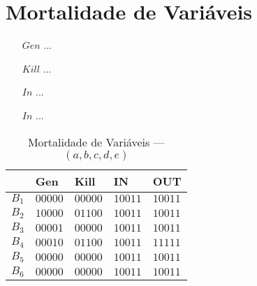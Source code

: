 \section{Mortalidade de Vari\'aveis}

\begin{itemize}
  \item[$Gen$] ...
  \item[$Kill$] ...
  \item[$In$] ...
  \item[$In$] ...
\end{itemize}

\begin{table}[ht]
\centering
\begin{tabular}{l|l|l|l|l}
	& Gen & Kill & IN & OUT\\
\hline
$B_{1}$ &  $00000$ & $00000$ & $10011$ & $10011$\\
$B_{2}$ &  $10000$ & $01100$ & $10011$ & $10011$\\
$B_{3}$ &  $00001$ & $00000$ & $10011$ & $10011$\\
$B_{4}$ &  $00010$ & $01100$ & $10011$ & $11111$\\
$B_{5}$ &  $00000$ & $00000$ & $10011$ & $10011$\\
$B_{6}$ &  $00000$ & $00000$ & $10011$ & $10011$\\
\end{tabular}
\caption{Mortalidade de Vari\'aveis --- $(a, b, c, d, e)$}
\end{table}

